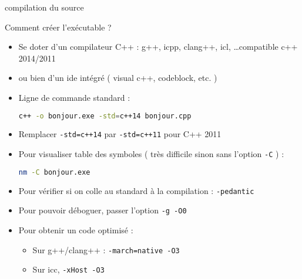 \documentclass[handout,10pt]{beamer}
\begin{document}
\begin{frame}[fragile]{compilation du source}
\tiny
\begin{block}{Comment créer l'exécutable ?}
\begin{itemize}
\item Se doter d'un compilateur C++ : g++, icpp, clang++, icl, \ldots compatible c++ 2014/2011
\item ou bien d'un ide intégré  ( visual c++, codeblock, etc. )
\item Ligne de commande standard :
\begin{lstlisting}[language=bash]
c++ -o bonjour.exe -std=c++14 bonjour.cpp
\end{lstlisting}
\item Remplacer \lstinline$-std=c++14$ par \lstinline$-std=c++11$ pour C++ 2011
\item Pour visualiser table des symboles ( très difficile sinon sans l'option \lstinline$-C$ ) :
\begin{lstlisting}[language=bash]
nm -C bonjour.exe
\end{lstlisting}
\item Pour vérifier si on colle au standard à la compilation : \lstinline$-pedantic$
\item Pour pouvoir déboguer, passer l'option \lstinline$-g -O0$
\item Pour obtenir un code optimisé : 
\begin{itemize}
\item Sur g++/clang++ : \lstinline$-march=native -O3$
\item Sur icc, \lstinline$-xHost -O3$
\end{itemize}
\end{itemize}
\end{block}
\end{frame}
\end{document}
